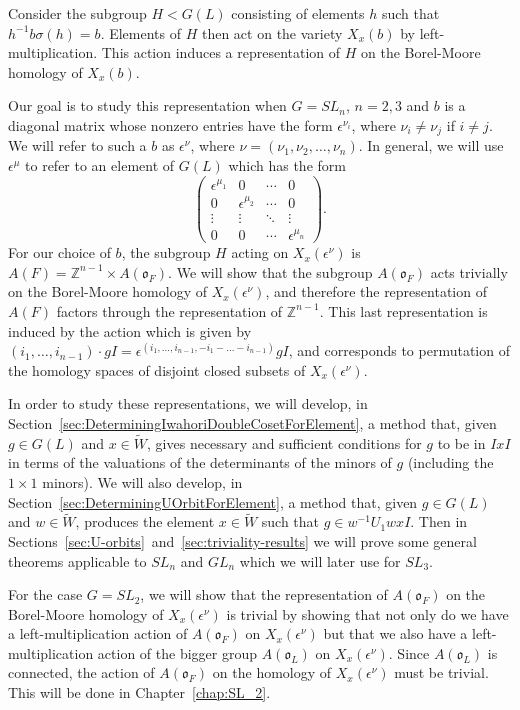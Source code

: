 \documentclass{amsart}
\theoremstyle{definition}
\def\O{\mathfrak{o}}
\def\e{\epsilon}
\def\W{\widetilde{W}}
\def\s{\sigma}
\def\A{A(\O_F)}
\def\en{\e^{\nu}}
\def\X{X_x(\en)}
\def\Z{\mathbb{Z}}
\begin{document}
  Consider the subgroup $H < G(L)$ consisting of elements $h$ such
  that $h^{-1}b\s(h) = b$.  Elements of $H$ then act on the variety $X_x(b)$ by
  left-multiplication.  This action induces a representation of $H$ on the
  Borel-Moore homology of $X_x(b)$.

  Our goal is to study this representation when $G = SL_n$, $n = 2,3$ and $b$
  is a diagonal matrix whose nonzero entries have the form $\e^{\nu_i}$, where
  $\nu_i \neq \nu_j$ if $i \neq j$.  We will refer to such a $b$ as $\en$,
  where $\nu = (\nu_1, \nu_2, \ldots, \nu_n)$.  In general, we will use
  $\e^\mu$ to refer to an element of $G(L)$ which has the form
  \begin{equation*}
    \begin{pmatrix}
      \e^{\mu_1} & 0 & \cdots & 0 \\
      0 & \e^{\mu_2} & \cdots & 0 \\
      \vdots& \vdots & \ddots & \vdots \\
      0 & 0 & \cdots & \e^{\mu_n}
    \end{pmatrix}.
  \end{equation*}
  For our choice of $b$, the subgroup $H$ acting on $\X$ is $A(F) = \Z^{n-1}
  \times \A$.  We will show that the subgroup $\A$ acts trivially on the
  Borel-Moore homology of $\X$, and therefore the representation of $A(F)$
  factors through the representation of $\Z^{n-1}$.  This last representation
  is induced by the action which is given by $(i_1, \ldots, i_{n-1}) \cdot gI =
  \e^{(i_1, \ldots, i_{n-1}, -i_1-\ldots-i_{n-1})}gI$, and corresponds to
  permutation of the homology spaces of disjoint closed subsets of $\X$.

  In order to study these representations, we will develop, in
  Section~\ref{sec:DeterminingIwahoriDoubleCosetForElement}, a method that,
  given $g \in G(L)$ and $x \in \W$, gives necessary and sufficient conditions
  for $g$ to be in $IxI$ in terms of the valuations of the determinants of the
  minors of $g$ (including the $1 \times 1$ minors).  We will also develop, in
  Section~\ref{sec:DeterminingUOrbitForElement}, a method that, given $g \in
  G(L)$ and $w \in \W$, produces the element $x \in \W$ such that $g \in
  w^{-1}U_1 w x I$.  Then in
  Sections~\ref{sec:U-orbits}~and~\ref{sec:triviality-results} we will prove
  some general theorems applicable to $SL_n$ and $GL_n$ which we will later use
  for $SL_3$.

  For the case $G = SL_2$, we will show that the representation of $\A$ on
  the Borel-Moore homology of $\X$ is trivial by showing that not only do we
  have a left-multiplication action of $\A$ on $\X$ but that we also have
  a left-multiplication action of the bigger group $A(\O_L)$ on $\X$.  Since
  $A(\O_L)$ is connected, the action of $\A$ on the homology of $\X$ must
  be trivial.  This will be done in Chapter~\ref{chap:SL_2}.
\end{document}
